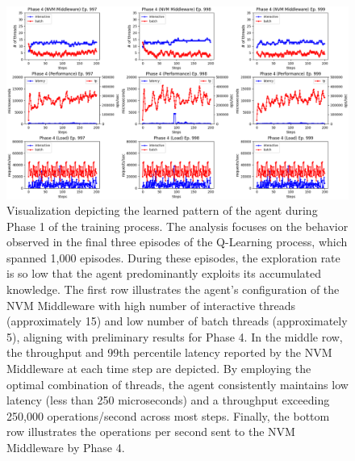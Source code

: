   \begin{figure}[ht]
    \centering
    \includegraphics[width=\textwidth,height=\textheight,keepaspectratio,angle=0]{images/rl_training_phase4.png}
    \caption[Learned Pattern of Agent during Phase 3]{Visualization depicting the learned pattern of the agent during Phase 1 of the training process. The analysis focuses on the behavior observed in the final three episodes of the Q-Learning process, which spanned 1,000 episodes. During these episodes, the exploration rate is so low that the agent predominantly exploits its accumulated knowledge. The first row illustrates the agent's configuration of the NVM Middleware with high number of interactive threads (approximately 15) and low number of batch threads (approximately 5), aligning with preliminary results for Phase 4. In the middle row, the throughput and 99th percentile latency reported by the NVM Middleware at each time step are depicted. By employing the optimal combination of threads, the agent consistently maintains low latency (less than 250 microseconds) and a throughput exceeding 250,000 operations/second across most steps. Finally, the bottom row illustrates the operations per second sent to the NVM Middleware by Phase 4.}
    \label{fig:learned_phase_4}
  \end{figure}